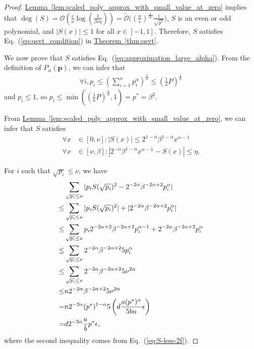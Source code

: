 \documentclass[journal]{IEEEtran}
\newcommand{\eq}[1]{Eq.~(\ref{eq:#1})}
\newcommand{\thm}[1]{\hyperref[thm:#1]{Theorem~\ref*{thm:#1}}}
\newcommand{\lem}[1]{\hyperref[lem:#1]{Lemma~\ref*{lem:#1}}}
\begin{document}
\begin{proof}
  \lem{scaled_poly_approx_with_small_value_at_zero} implies that $\deg(S)= \mathcal{O}\left(\frac{c}{\nu} \log(\frac{1}{\beta\nu\eta})\right) =\widetilde{\mathcal{O}}\bigl(\left(\frac{n}{\epsilon}\right)^{\frac{1}{2\alpha}} \frac{1}{\sqrt{p^*}}\bigr)$, $S$ is an even or odd polynomial, and $|S(x)|\le 1$ for all $x\in[-1,1]$. Therefore, $S$ satisfies \eq{qsvt_condition} in \thm{qsvt}.

  We now prove that $S$ satisfies \eq{approximation_large_alpha}. From the definition of $P_\alpha(\mathbf{p})$, we can infer that
    \begin{align}
      \label{eq:range-p}
      \forall i,p_i \le \left(\sum_{i = 1}^n p_i^{\alpha}\right)^{\frac{1}{\alpha}} \le \left(\frac{1}{a}P\right)^{\frac{1}{\alpha}}
    \end{align}
    and $p_i \le 1$, so $p_i\le \min((\frac{1}{a}P)^{\frac{1}{\alpha}},1) = p^* = \beta^2$.

  From \lem{scaled_poly_approx_with_small_value_at_zero}, we can infer that $S$ satisfies
  \begin{align}
    \forall x & \in [0,\nu]: |S(x)| \le  2^{1-\alpha}\beta^{1-\alpha}x^{\alpha-1}          \label{eq:S-less-2f}  
    \\
    \forall x & \in [\nu, \beta]: |2^{-\alpha}\beta^{1-\alpha}x^{\alpha-1}-S(x)| \le \eta \label{eq:error-less-eta}. %
  \end{align}
      
  For $i$ such that $\sqrt{p_i} \le \nu$, we have
  \begin{align}
      &\sum_{\sqrt{p_i} \le \nu} |p_iS(\sqrt{p_i})^2-2^{-2\alpha}\beta^{-2\alpha+2}p_i^{\alpha}|
        \nonumber \\ \le & \sum_{\sqrt{p_i} \le \nu}|p_iS(\sqrt{p_i})^2| + |2^{-2\alpha}\beta^{-2\alpha+2}p_i^{\alpha}|      \notag                          \\
        \le & \sum_{\sqrt{p_i} \le \nu} p_i2^{-2\alpha+2}\beta^{-2\alpha+2}p_i^{\alpha-1} + 2^{-2\alpha}\beta^{-2\alpha+2}p_i^{\alpha}               \notag   \\
        \le & \sum_{\sqrt{p_i} \le \nu} 2^{-2\alpha}\beta^{-2\alpha+2}5p_i^{\alpha}                                                 \notag    \\
        \le & \sum_{\sqrt{p_i} \le \nu} 2^{-2\alpha}\beta^{-2\alpha+2}5\nu^{2\alpha}                                                  \notag  \\
        \le & n2^{-2\alpha}\beta^{-2\alpha+2}5\nu^{2\alpha} \notag \\
        = &n2^{-2\alpha}(p^*)^{1-\alpha}5\left(d\frac{a(p^*)^{\alpha}}{5bn}\epsilon\right)\notag \\
        = &d2^{-2\alpha}\frac{a}{b}p^* \epsilon, \label{eq:large_alpha_little_delta}
    \end{align}
  where the second inequality comes from \eq{S-less-2f}.


\end{proof}
\end{document}
